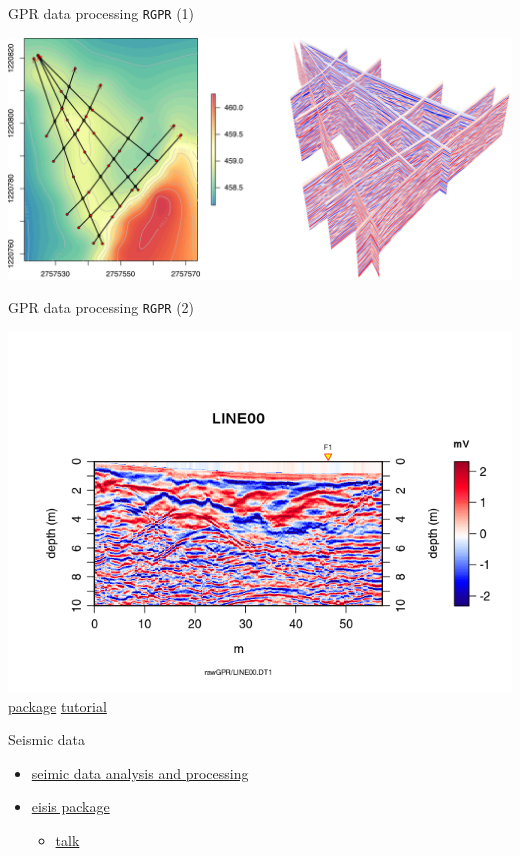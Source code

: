 \documentclass[8pt,ignorenonframetext,]{beamer}
\providecommand{\tightlist}{%
  \setlength{\itemsep}{0pt}\setlength{\parskip}{0pt}}
\begin{document}
\begin{frame}{GPR data processing \texttt{RGPR} (1)}

\includegraphics{imgPres/GPR_processing01.png}

\end{frame}

\begin{frame}{GPR data processing \texttt{RGPR} (2)}

\includegraphics{imgPres/GPR_processing02.png}
\href{https://github.com/emanuelhuber/RGPR}{package}
\href{http://emanuelhuber.github.io/RGPR/}{tutorial}

\end{frame}

\begin{frame}{Seismic data}

\begin{itemize}
\tightlist
\item
  \href{http://mazamascience.com/Classes/IRIS_2015/}{seimic data
  analysis and processing}
\item
  \href{https://www.earth-surf-dynam-discuss.net/esurf-2017-75/esurf-2017-75.pdf}{eisis
  package}

  \begin{itemize}
  \tightlist
  \item
    \href{http://www.unc.edu/~leesj/FETCH/GRAB/Vignettes/whyRbeam.pdf}{talk}
  \end{itemize}
\end{itemize}

\end{frame}
\end{document}
